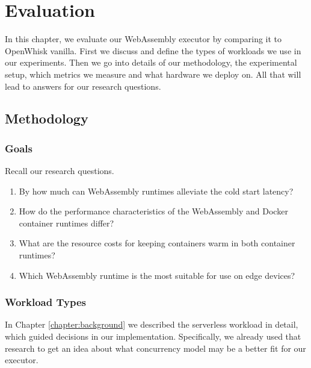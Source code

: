\chapter{Evaluation}
\label{chapter:evaluation}

In this chapter, we evaluate our WebAssembly executor by comparing it to OpenWhisk vanilla. First we discuss and define the types of workloads we use in our experiments. Then we go into details of our methodology, the experimental setup, which metrics we measure and what hardware we deploy on. All that will lead to answers for our research questions.

\section{Methodology}

\subsection{Goals}

Recall our research questions.

\begin{enumerate}
    \item By how much can WebAssembly runtimes alleviate the cold start latency?
  
    \item How do the performance characteristics of the WebAssembly and Docker container runtimes differ?
  
    \item What are the resource costs for keeping containers warm in both container runtimes?
  
    \item Which WebAssembly runtime is the most suitable for use on edge devices?
\end{enumerate}


\subsection{Workload Types}

In Chapter \ref{chapter:background} we described the serverless workload in detail, which guided decisions in our implementation. Specifically, we already used that research to get an idea about what concurrency model may be a better fit for our executor.

